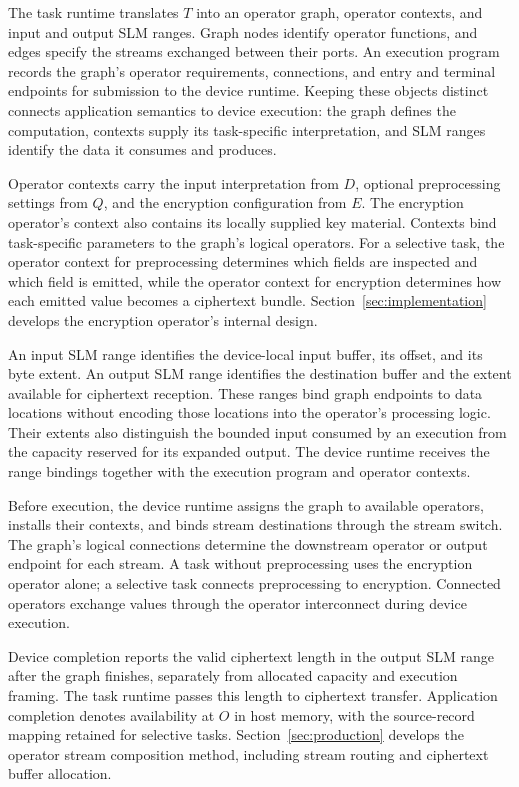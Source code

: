 \documentclass[sigconf,anonymous,balance=false]{acmart}
\newcommand{\bodypar}{\par\vskip 0pt plus 6pt\relax}
\begin{document}
The task runtime translates $T$ into an operator graph, operator contexts, and input and output SLM ranges. Graph nodes identify operator functions, and edges specify the streams exchanged between their ports. An execution program records the graph's operator requirements, connections, and entry and terminal endpoints for submission to the device runtime. Keeping these objects distinct connects application semantics to device execution: the graph defines the computation, contexts supply its task-specific interpretation, and SLM ranges identify the data it consumes and produces.
\bodypar

Operator contexts carry the input interpretation from $D$, optional preprocessing settings from $Q$, and the encryption configuration from $E$. The encryption operator's context also contains its locally supplied key material. Contexts bind task-specific parameters to the graph's logical operators. For a selective task, the operator context for preprocessing determines which fields are inspected and which field is emitted, while the operator context for encryption determines how each emitted value becomes a ciphertext bundle. Section~\ref{sec:implementation} develops the encryption operator's internal design.
\bodypar

An input SLM range identifies the device-local input buffer, its offset, and its byte extent. An output SLM range identifies the destination buffer and the extent available for ciphertext reception. These ranges bind graph endpoints to data locations without encoding those locations into the operator's processing logic. Their extents also distinguish the bounded input consumed by an execution from the capacity reserved for its expanded output. The device runtime receives the range bindings together with the execution program and operator contexts.
\bodypar

Before execution, the device runtime assigns the graph to available operators, installs their contexts, and binds stream destinations through the stream switch. The graph's logical connections determine the downstream operator or output endpoint for each stream. A task without preprocessing uses the encryption operator alone; a selective task connects preprocessing to encryption. Connected operators exchange values through the operator interconnect during device execution.

Device completion reports the valid ciphertext length in the output SLM range after the graph finishes, separately from allocated capacity and execution framing. The task runtime passes this length to ciphertext transfer. Application completion denotes availability at $O$ in host memory, with the source-record mapping retained for selective tasks. Section~\ref{sec:production} develops the operator stream composition method, including stream routing and ciphertext buffer allocation.
\end{document}

